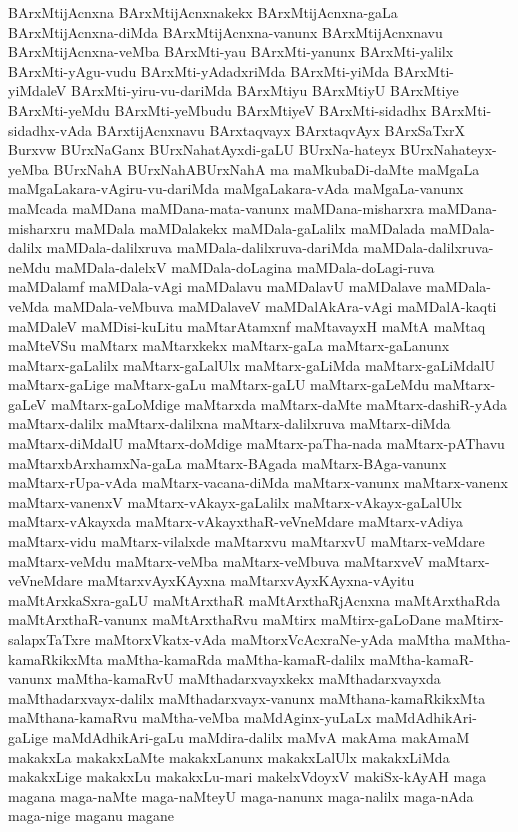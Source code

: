 {BArxMtijAcnxna
BArxMtijAcnxnakekx
BArxMtijAcnxna-gaLa
BArxMtijAcnxna-diMda
BArxMtijAcnxna-vanunx
BArxMtijAcnxnavu
BArxMtijAcnxna-veMba
BArxMti-yau
BArxMti-yanunx
BArxMti-yalilx
BArxMti-yAgu-vudu
BArxMti-yAdadxriMda
BArxMti-yiMda
BArxMti-yiMdaleV
BArxMti-yiru-vu-dariMda
BArxMtiyu
BArxMtiyU
BArxMtiye
BArxMti-yeMdu
BArxMti-yeMbudu
BArxMtiyeV
BArxMti-sidadhx
BArxMti-sidadhx-vAda
BArxtijAcnxnavu
BArxtaqvayx
BArxtaqvAyx
BArxSaTxrX
Burxvw
BUrxNaGanx
BUrxNahatAyxdi-gaLU
BUrxNa-hateyx
BUrxNahateyx-yeMba
BUrxNahA
BUrxNahABUrxNahA
ma
maMkubaDi-daMte
maMgaLa
maMgaLakara-vAgiru-vu-dariMda
maMgaLakara-vAda
maMgaLa-vanunx
maMcada
maMDana
maMDana-mata-vanunx
maMDana-misharxra
maMDana-misharxru
maMDala
maMDalakekx
maMDala-gaLalilx
maMDalada
maMDala-dalilx
maMDala-dalilxruva
maMDala-dalilxruva-dariMda
maMDala-dalilxruva-neMdu
maMDala-dalelxV
maMDala-doLagina
maMDala-doLagi-ruva
maMDalamf
maMDala-vAgi
maMDalavu
maMDalavU
maMDalave
maMDala-veMda
maMDala-veMbuva
maMDalaveV
maMDalAkAra-vAgi
maMDalA-kaqti
maMDaleV
maMDisi-kuLitu
maMtarAtamxnf
maMtavayxH
maMtA
maMtaq
maMteVSu
maMtarx
maMtarxkekx
maMtarx-gaLa
maMtarx-gaLanunx
maMtarx-gaLalilx
maMtarx-gaLalUlx
maMtarx-gaLiMda
maMtarx-gaLiMdalU
maMtarx-gaLige
maMtarx-gaLu
maMtarx-gaLU
maMtarx-gaLeMdu
maMtarx-gaLeV
maMtarx-gaLoMdige
maMtarxda
maMtarx-daMte
maMtarx-dashiR-yAda
maMtarx-dalilx
maMtarx-dalilxna
maMtarx-dalilxruva
maMtarx-diMda
maMtarx-diMdalU
maMtarx-doMdige
maMtarx-paTha-nada
maMtarx-pAThavu
maMtarxbArxhamxNa-gaLa
maMtarx-BAgada
maMtarx-BAga-vanunx
maMtarx-rUpa-vAda
maMtarx-vacana-diMda
maMtarx-vanunx
maMtarx-vanenx
maMtarx-vanenxV
maMtarx-vAkayx-gaLalilx
maMtarx-vAkayx-gaLalUlx
maMtarx-vAkayxda
maMtarx-vAkayxthaR-veVneMdare
maMtarx-vAdiya
maMtarx-vidu
maMtarx-vilalxde
maMtarxvu
maMtarxvU
maMtarx-veMdare
maMtarx-veMdu
maMtarx-veMba
maMtarx-veMbuva
maMtarxveV
maMtarx-veVneMdare
maMtarxvAyxKAyxna
maMtarxvAyxKAyxna-vAyitu
maMtArxkaSxra-gaLU
maMtArxthaR
maMtArxthaRjAcnxna
maMtArxthaRda
maMtArxthaR-vanunx
maMtArxthaRvu
maMtirx
maMtirx-gaLoDane
maMtirx-salapxTaTxre
maMtorxVkatx-vAda
maMtorxVcAcxraNe-yAda
maMtha
maMtha-kamaRkikxMta
maMtha-kamaRda
maMtha-kamaR-dalilx
maMtha-kamaR-vanunx
maMtha-kamaRvU
maMthadarxvayxkekx
maMthadarxvayxda
maMthadarxvayx-dalilx
maMthadarxvayx-vanunx
maMthana-kamaRkikxMta
maMthana-kamaRvu
maMtha-veMba
maMdAginx-yuLaLx
maMdAdhikAri-gaLige
maMdAdhikAri-gaLu
maMdira-dalilx
maMvA
makAma
makAmaM
makakxLa
makakxLaMte
makakxLanunx
makakxLalUlx
makakxLiMda
makakxLige
makakxLu
makakxLu-mari
makelxVdoyxV
makiSx-kAyAH
maga
magana
maga-naMte
maga-naMteyU
maga-nanunx
maga-nalilx
maga-nAda
maga-nige
maganu
magane
}
